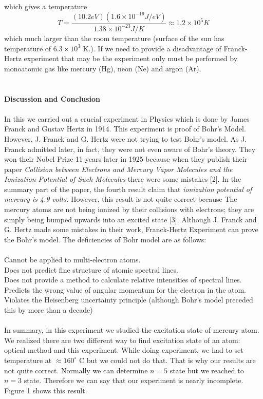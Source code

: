 \documentclass[a4paper,12pt]{article}
\begin{document}
which gives a temperature 
\begin{equation}
T=\frac{(10.2eV)(1.6\times 10^{-19}J/eV)}{1.38\times 10^{-23}J/K}\approx 1.2\times 10^{5}K
\end{equation}
which much larger than the room temperature (surface of the sun has temperature of $6.3\times 10^{3}$ K.). If we need to provide a disadvantage of Franck-Hertz experiment that may be the experiment only must be performed by monoatomic gas like mercury (Hg), neon (Ne) and argon (Ar).\\\\\\
\textbf{Discussion and Conclusion}\\\\
In this we carried out a crucial experiment in Physics which is done by James Franck and Gustav Hertz in 1914. This experiment is proof of Bohr's Model. However, J. Franck and G. Hertz were not trying to test Bohr's model. As J. Franck admitted later, in fact, they were not even aware of Bohr's theory. They won their Nobel Prize 11 years later in 1925 because when they publish their paper \textit{Collision between Electrons and Mercury Vapor Molecules and the Ionization Potential of Such Molecules} there were some mistakes [2]. In the summary part of the paper, the fourth result claim that \textit{ionization potential of mercury is 4.9 volts.} However, this result is not quite correct because The mercury atoms are not being ionized by their collisions with electrons; they are simply being bumped upwards into an excited state [3]. Although J. Franck and G. Hertz made some mistakes in their work, Franck-Hertz Experiment can prove the Bohr's model. The deficiencies of Bohr model are as follows:\\\\
\textbullet  Cannot be applied to multi-electron atoms.\\
\textbullet Does not predict fine structure of atomic spectral lines.\\
\textbullet Does not provide a method to calculate relative intensities of spectral
lines.\\
\textbullet Predicts the wrong value of angular momentum for the electron in the
atom.\\
\textbullet Violates the Heisenberg uncertainty principle (although Bohr’s model
preceded this by more than a decade)\\\\
\newpage
In summary, in this experiment we studied the excitation state of mercury atom. We realized there are two different way to find excitation state of an atom: optical method and this experiment. While doing experiment, we had to set temperature at $\approx160^{\circ}$ C but we could not do that. That is why our results are not quite correct. Normally we can determine $n=5$ state but we reached to $n=3$ state. Therefore we can say that our experiment is nearly incomplete. Figure 1 shows this result.\\\\\\
\end{document}
